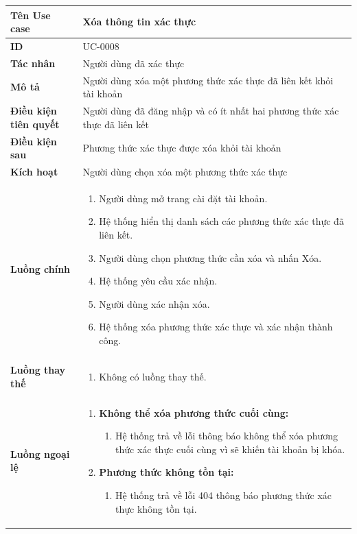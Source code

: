 {
\renewcommand{\arraystretch}{1.5}

\begin{tabularx}{\textwidth}{|>{\raggedright\arraybackslash}X|>{\raggedright\arraybackslash}X|}
\hline
\textbf{Tên Use case} & Xóa thông tin xác thực \\
\hline
\textbf{ID} & UC-0008 \\
\hline
\textbf{Tác nhân} & Người dùng đã xác thực \\
\hline
\textbf{Mô tả} & Người dùng xóa một phương thức xác thực đã liên kết khỏi tài khoản \\
\hline
\textbf{Điều kiện tiên quyết} & Người dùng đã đăng nhập và có ít nhất hai phương thức xác thực đã liên kết \\
\hline
\textbf{Điều kiện sau} & Phương thức xác thực được xóa khỏi tài khoản \\
\hline
\textbf{Kích hoạt} & Người dùng chọn xóa một phương thức xác thực \\
\hline
\textbf{Luồng chính} &
\begin{enumerate}
    \item Người dùng mở trang cài đặt tài khoản.
    \item Hệ thống hiển thị danh sách các phương thức xác thực đã liên kết.
    \item Người dùng chọn phương thức cần xóa và nhấn Xóa.
    \item Hệ thống yêu cầu xác nhận.
    \item Người dùng xác nhận xóa.
    \item Hệ thống xóa phương thức xác thực và xác nhận thành công.
\end{enumerate} \\
\hline
\textbf{Luồng thay thế} &
\begin{enumerate}
    \item Không có luồng thay thế.
\end{enumerate} \\
\hline
\textbf{Luồng ngoại lệ} &
\begin{enumerate}
    \item \textbf{Không thể xóa phương thức cuối cùng:}
    \begin{enumerate}
        \item[6Err.] Hệ thống trả về lỗi thông báo không thể xóa phương thức xác thực cuối cùng vì sẽ khiến tài khoản bị khóa.
    \end{enumerate}
    \item \textbf{Phương thức không tồn tại:}
    \begin{enumerate}
        \item[3Err.] Hệ thống trả về lỗi 404 thông báo phương thức xác thực không tồn tại.
    \end{enumerate}
\end{enumerate} \\
\hline
\end{tabularx}
}
